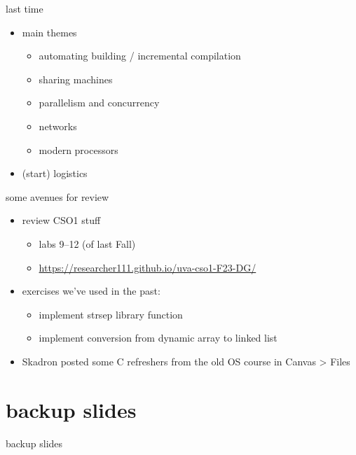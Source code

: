 \date{}
\title{}
\date{}

\begin{frame}
    \titlepage
\end{frame}



\begin{frame}{last time}
    \begin{itemize}
    \item main themes
        \begin{itemize}
        \item automating building / incremental compilation
        \item sharing machines
        \item parallelism and concurrency
        \item networks
        \item modern processors
        \end{itemize}
    \item (start) logistics
    \end{itemize}
\end{frame}





\begin{frame}{some avenues for review}
    \begin{itemize}
    \item review CSO1 stuff
        \begin{itemize}
        \item labs 9--12 (of last Fall)
        \item \url{https://researcher111.github.io/uva-cso1-F23-DG/}
        \end{itemize}
    \item exercises we've used in the past:
        \begin{itemize}
        \item implement strsep library function
        \item implement conversion from dynamic array to linked list
        \end{itemize}
    \item Skadron posted some C refreshers from the old OS course in Canvas > Files
    \end{itemize}
\end{frame}



\section{backup slides}
\begin{frame}{backup slides}
\end{frame}


